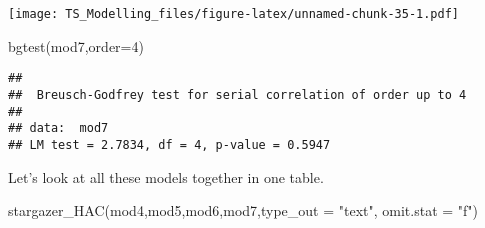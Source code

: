 \documentclass[
]{article}
\newenvironment{Shaded}{\begin{snugshade}}{\end{snugshade}}
\newcommand{\AttributeTok}[1]{\textcolor[rgb]{0.77,0.63,0.00}{#1}}
\newcommand{\DecValTok}[1]{\textcolor[rgb]{0.00,0.00,0.81}{#1}}
\newcommand{\FunctionTok}[1]{\textcolor[rgb]{0.00,0.00,0.00}{#1}}
\newcommand{\NormalTok}[1]{#1}
\newcommand{\SpecialCharTok}[1]{\textcolor[rgb]{0.00,0.00,0.00}{#1}}
\newcommand{\StringTok}[1]{\textcolor[rgb]{0.31,0.60,0.02}{#1}}
\begin{document}
\begin{Shaded}
\end{Shaded}

\texttt{[image: TS\_Modelling\_files/figure-latex/unnamed-chunk-35-1.pdf]}

\begin{Shaded}
\begin{Highlighting}[]
\FunctionTok{bgtest}\NormalTok{(mod7,}\AttributeTok{order=}\DecValTok{4}\NormalTok{)}
\end{Highlighting}
\end{Shaded}

\begin{verbatim}
## 
##  Breusch-Godfrey test for serial correlation of order up to 4
## 
## data:  mod7
## LM test = 2.7834, df = 4, p-value = 0.5947
\end{verbatim}

Let's look at all these models together in one table.

\begin{Shaded}
\begin{Highlighting}[]
\FunctionTok{stargazer\_HAC}\NormalTok{(mod4,mod5,mod6,mod7,}\AttributeTok{type\_out =} \StringTok{"text"}\NormalTok{, }\AttributeTok{omit.stat =} \StringTok{"f"}\NormalTok{)}
\end{Highlighting}
\end{Shaded}
\end{document}
